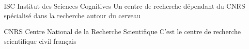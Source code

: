   {ISC}
  {Institut des Sciences Cognitives}
  {Un centre de recherche dépendant du \gls{CNRS} spécialisé dans la recherche autour du cerveau}

  {CNRS}
  {Centre National de la Recherche Scientifique}
  {C'est le centre de recherche scientifique civil français}